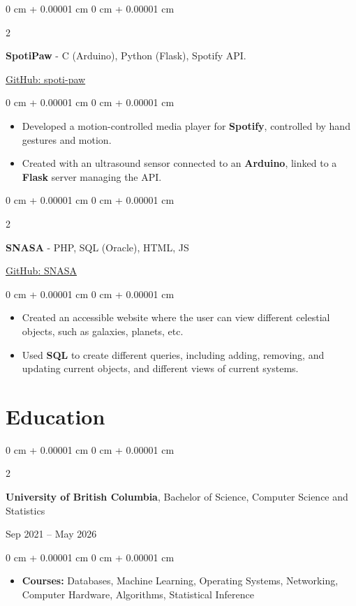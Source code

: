 \documentclass[9pt, letterpaper]{extarticle}
\newenvironment{highlights}{
    \begin{itemize}[
        topsep=0.10 cm,
        parsep=0.10 cm,
        partopsep=0pt,
        itemsep=0pt,
        leftmargin=0 cm + 10pt
    ]
}{
    \end{itemize}
} %
\newenvironment{onecolentry}{
    \begin{adjustwidth}{
        0 cm + 0.00001 cm
    }{
        0 cm + 0.00001 cm
    }
}{
    \end{adjustwidth}
} %
\newenvironment{twocolentry}[2][]{
    \onecolentry
    \def\secondColumn{#2}
    \setcolumnwidth{\fill, 4.5 cm}
    \begin{paracol}{2}
}{
    \switchcolumn \raggedleft \secondColumn
    \end{paracol}
    \endonecolentry
} %
\begin{document}
        \vspace{0.2 cm}


        \begin{twocolentry}
            {\href{https://github.com/ayushtvora/spoti-paw}{GitHub: spoti-paw}}
            \textbf{SpotiPaw} - C (Arduino), Python (Flask), Spotify API. 
        \end{twocolentry}
        \vspace{0.10 cm}
        \begin{onecolentry}
            \begin{highlights}
                \item Developed a motion-controlled media player for \textbf{Spotify}, controlled by hand gestures and motion.
                \item Created with an ultrasound sensor connected to an \textbf{Arduino}, linked to a \textbf{Flask} server managing the API.
            \end{highlights}
        \end{onecolentry}

        \vspace{0.2 cm}

        \begin{twocolentry}
        {\href{https://github.com/ayushtvora/SNASA}{GitHub: SNASA}}
            \textbf{SNASA} - PHP, SQL (Oracle), HTML, JS 
        \end{twocolentry}
        \vspace{0.10 cm}
        \begin{onecolentry}
            \begin{highlights}
                \item Created an accessible website where the user can view different celestial objects, such as galaxies, planets, etc.
                \item Used \textbf{SQL} to create different queries, including adding, removing, and updating current objects, and different views of current systems.
            \end{highlights}
        \end{onecolentry}



    \section{Education}
        \begin{twocolentry}{Sep 2021 – May 2026}
            \textbf{University of British Columbia}, Bachelor of Science, Computer Science and Statistics
        \end{twocolentry}
        \vspace{0.10 cm}
        \begin{onecolentry}
            \begin{highlights}
                \item \textbf{Courses:} Databases, Machine Learning, Operating Systems, Networking, Computer Hardware, Algorithms, Statistical Inference
            \end{highlights}
        \end{onecolentry}
\end{document}
